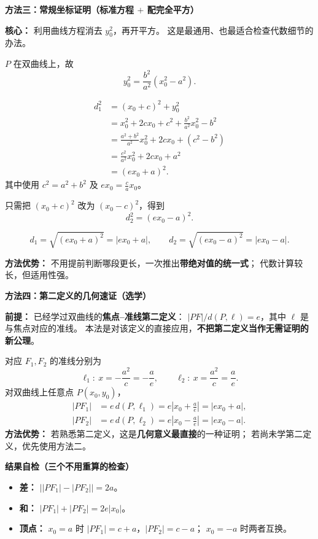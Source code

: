 \begin{proofbox}
\medskip
\textbf{\textcolor{CProof}{方法三：常规坐标证明（标准方程 $+$ 配完全平方）}}

\textbf{核心：} 利用曲线方程消去 $y_0^2$，再开平方。
这是最通用、也最适合检查代数细节的办法。

\begin{description}[style=nextline,leftmargin=2.8em,labelsep=0.5em,itemsep=0.45em]
 \item[\textbf{第一步（消去 $y_0^2$）：}]
   $P$ 在双曲线上，故
   \[
    y_0^2=\frac{b^2}{a^2}(x_0^2-a^2).
   \]
 \item[\textbf{第二步（计算左焦半径的平方）：}]
   \[
   \begin{aligned}
    d_1^2&=(x_0+c)^2+y_0^2\\
    &=x_0^2+2cx_0+c^2+\frac{b^2}{a^2}x_0^2-b^2\\
    &=\frac{a^2+b^2}{a^2}x_0^2+2cx_0+(c^2-b^2)\\
    &=\frac{c^2}{a^2}x_0^2+2cx_0+a^2\\
    &=(ex_0+a)^2.
   \end{aligned}
   \]
   其中使用 $c^2=a^2+b^2$ 及 $ex_0=\frac ca x_0$。
 \item[\textbf{第三步（计算右焦半径）：}]
   只需把 $(x_0+c)^2$ 改为 $(x_0-c)^2$，得到
   \[
    d_2^2=(ex_0-a)^2.
   \]
 \item[\textbf{第四步（开方，绝对值不能丢）：}]
   \[
     \boxed{d_1=\sqrt{(ex_0+a)^2}=|ex_0+a|},\qquad
     \boxed{d_2=\sqrt{(ex_0-a)^2}=|ex_0-a|}.
   \]
\end{description}
\textbf{方法优势：} 不用提前判断哪段更长，一次推出\textbf{带绝对值的统一式}；
代数计算较长，但适用性强。

\medskip
\textbf{\textcolor{CProof}{方法四：第二定义的几何速证（选学）}}

\textbf{前提：} 已经学过双曲线的\textbf{焦点--准线第二定义}：
$|PF|/d(P,\ell)=e$，其中 $\ell$ 是与焦点对应的准线。
本法是对该定义的直接应用，\textbf{不把第二定义当作无需证明的新公理}。

对应 $F_1,F_2$ 的准线分别为
\[
 \ell_1:\ x=-\frac{a^2}{c}=-\frac ae,
 \qquad
 \ell_2:\ x=\frac{a^2}{c}=\frac ae.
\]
对双曲线上任意点 $P(x_0,y_0)$，
\[
 \begin{aligned}
 |PF_1|&=e\,d(P,\ell_1)
   =e\left|x_0+\frac ae\right|=|ex_0+a|,\\
 |PF_2|&=e\,d(P,\ell_2)
   =e\left|x_0-\frac ae\right|=|ex_0-a|.
 \end{aligned}
\]
\textbf{方法优势：} 若熟悉第二定义，这是\textbf{几何意义最直接}的一种证明；
若尚未学第二定义，优先使用方法二。

\medskip
\textbf{\textcolor{CProof}{结果自检（三个不用重算的检查）}}
\begin{itemize}[leftmargin=*,itemsep=0.35em,topsep=0.35em]
 \item \textbf{差：} $\bigl||PF_1|-|PF_2|\bigr|=2a$。
 \item \textbf{和：} $|PF_1|+|PF_2|=2e|x_0|$。
 \item \textbf{顶点：} $x_0=a$ 时 $|PF_1|=c+a$，$|PF_2|=c-a$；
      $x_0=-a$ 时两者互换。
\end{itemize}

\end{proofbox}
